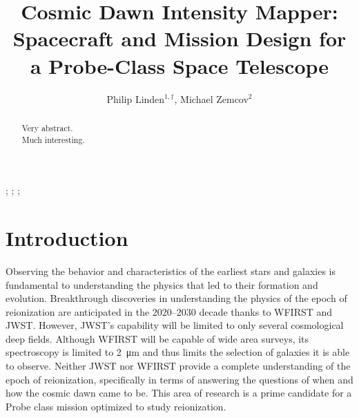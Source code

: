 \documentclass{ws-jai}
\begin{document}
\catchline{}{}{}{}{} %


\title{Cosmic Dawn Intensity Mapper: \\Spacecraft and Mission Design for a Probe-Class Space Telescope}

\author{Philip Linden$^{1,\dagger}$, Michael Zemcov$^{2}$}

\address{
$^1$Department of Mechanical Engineering, Kate Gleason College of Engineering, Rochester
Institute of Technology, Rochester, NY 14623, USA, pjl7651@rit.edu\\
$^2$Center for Detectors, School of Physics and Astronomy, Rochester
Institute of Technology, Rochester, NY 14623, USA, zemcov@cfd.rit.edu\\
}

\maketitle


\begin{history}
;
;
;
\end{history}

\begin{abstract}
  Very abstract.\\
  Much interesting.
\end{abstract}


\section{Introduction}
\label{S:introduction}
Observing the behavior and characteristics of the earliest stars and galaxies is fundamental to understanding the physics that led to their formation and evolution.
Breakthrough discoveries in understanding the physics of the epoch of reionization are anticipated in the 2020--2030 decade thanks to WFIRST and JWST\@.
However, JWST's capability will be limited to only several cosmological deep fields.
Although WFIRST will be capable of wide area surveys, its spectroscopy is limited to \SI{2}{\micro\meter} and thus limits the selection of galaxies it is able to observe.
Neither JWST nor WFIRST provide a complete understanding of the epoch of reionization, specifically in terms of answering the questions of when and how the cosmic dawn came to be.
This area of research is a prime candidate for a Probe class mission optimized to study reionization.
\end{document}

